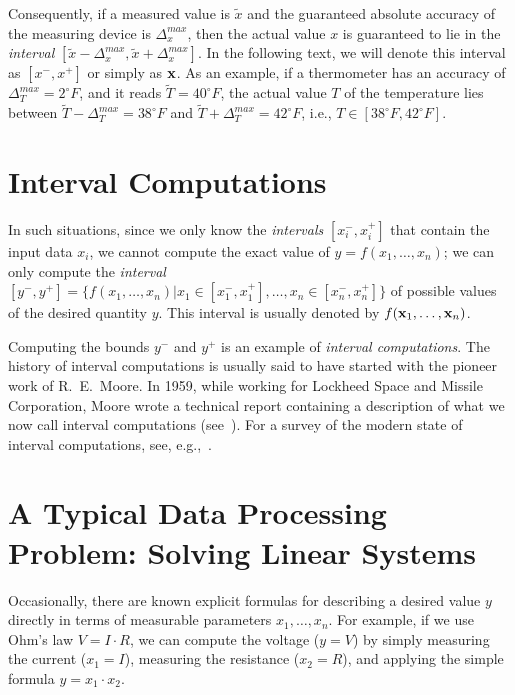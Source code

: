 Consequently, if a measured value is $\tilde x$ and the guaranteed absolute
accuracy of the measuring device is $\Delta^{max}_x$, then the actual value
$x$ is guaranteed to lie in the {\em interval\/} $[\tilde x-\Delta^{max}_x,
\tilde x+\Delta^{max}_x]$.
In the following text, we will denote this interval as $[x^-,x^+]$ or simply
as ${\bf x}$. As an example, if a thermometer has an accuracy of
$\Delta^{max}_T=2^{\circ}F$, and it reads $\tilde T=40^{\circ}F$, the actual
value $T$ of the temperature lies between $\tilde T-\Delta^{max}_T=
38^{\circ}F$ and $\tilde T+\Delta^{max}_T=42^{\circ}F$, i.e.,
$T\in[38^{\circ}F,42^{\circ}F]$.

\section{Interval Computations}

In such situations, since we only know the {\em intervals\/}
$[x^-_i,x^+_i]$ that
contain the input data $x_i$, we cannot compute the exact value of
$y=f(x_1,\ldots,x_n)$; we can only compute the {\it interval}
$[y^-,y^+]=\{f(x_1,\ldots,x_n)|x_1\in[x_1^-,x_1^+],
\ldots,x_n\in[x_n^-,x_n^+]\}$
of possible values of the desired quantity
$y$.  This interval is usually denoted by
$f({\bf x}_1,\ldots,{\bf x}_n)$.

Computing the bounds $y^-$ and $y^+$ is an example of {\em interval
computations}.  The history of interval computations is usually said to have
started with the pioneer work of R.~E.~Moore.  In 1959, while working for
Lockheed Space and Missile Corporation, Moore wrote a technical report
containing a description of what we now call interval computations
(see~\cite{Moore1959}).  For a survey of the modern state of interval
computations, see, e.g.,~\cite{Kearfott1996}.
\nocite{Kreinovich1996b}
\nocite{Kulisch1981}
\nocite{Moore1966}

\section{A Typical Data Processing Problem: Solving Linear Systems}

Occasionally, there are known explicit formulas for describing a desired value
$y$ directly in terms of measurable parameters $x_1,\ldots,x_n$. For example,
if we use Ohm's law $V=I\cdot R$, we can compute the voltage ($y=V$) by simply
measuring the current ($x_1=I$), measuring the resistance ($x_2=R$), and
applying the simple formula $y=x_1\cdot x_2$.

